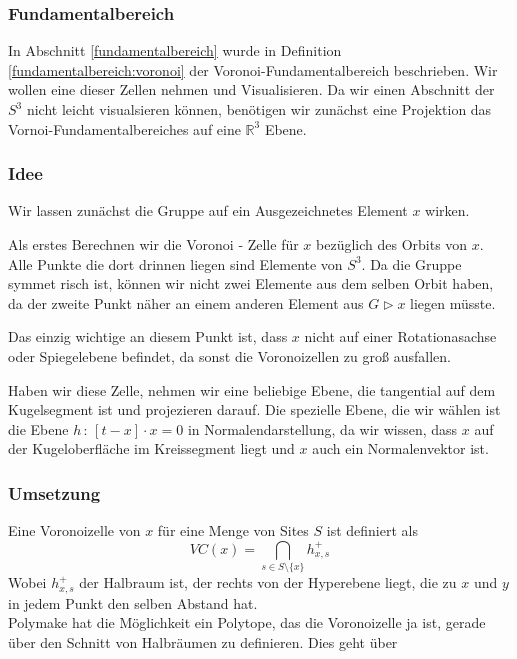     \subsubsection{Fundamentalbereich}
         In Abschnitt \ref{fundamentalbereich} wurde in Definition \ref{fundamentalbereich:voronoi} der Voronoi-Fundamentalbereich beschrieben. Wir wollen eine dieser Zellen
         nehmen und Visualisieren. Da wir einen Abschnitt der $S^3$ nicht leicht visualsieren können, benötigen wir zunächst eine Projektion das Vornoi-Fundamentalbereiches auf
         eine $\mathbb{R}^3$ Ebene.
        \subsubsection*{Idee}
            Wir lassen zunächst die Gruppe auf ein Ausgezeichnetes Element $x$ wirken.

            Als erstes Berechnen wir die Voronoi - Zelle für $x$ bezüglich des Orbits von $x$. Alle Punkte die dort drinnen liegen sind Elemente von $S^3$. Da die Gruppe symmet          risch ist, können wir nicht zwei Elemente aus dem selben Orbit haben, da der zweite Punkt näher an einem anderen Element aus $G \rhd x$ liegen müsste.

         Das einzig wichtige an diesem Punkt ist, dass $x$ nicht auf einer Rotationasachse oder Spiegelebene befindet, da sonst die Voronoizellen zu groß ausfallen.

         Haben wir diese Zelle, nehmen wir eine beliebige Ebene, die tangential auf dem Kugelsegment ist und projezieren darauf. Die spezielle Ebene, die wir wählen
         ist die Ebene $h \, : \, [t - x] \cdot x = 0$ in Normalendarstellung, da wir wissen, dass $x$ auf der Kugeloberfläche im Kreissegment liegt und $x$ auch ein
          Normalenvektor ist.
            
        \subsubsection*{Umsetzung}
         Eine Voronoizelle von $x$ für eine Menge von Sites $S$ ist definiert als 
         $$ VC(x) = \bigcap_{s \in S \setminus \{ x \}} h^+_{x,s}$$
         Wobei $h^+_{x,s}$ der Halbraum ist, der rechts von der Hyperebene liegt, die zu $x$ und $y$ in jedem Punkt den selben Abstand hat.\\

         Polymake hat die Möglichkeit ein Polytope, das die Voronoizelle ja ist, gerade über den Schnitt von Halbräumen zu definieren. Dies geht über

